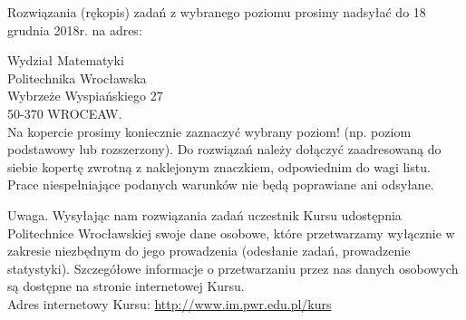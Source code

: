 \documentclass[10pt]{article}
\begin{document}
Rozwiązania (rękopis) zadań z wybranego poziomu prosimy nadsyłać do 18 grudnia 2018r. na adres:

Wydział Matematyki\\
Politechnika Wrocławska\\
Wybrzeże Wyspiańskiego 27\\
50-370 WROCEAW.\\
Na kopercie prosimy koniecznie zaznaczyć wybrany poziom! (np. poziom podstawowy lub rozszerzony). Do rozwiązań należy dołączyć zaadresowaną do siebie kopertę zwrotną z naklejonym znaczkiem, odpowiednim do wagi listu. Prace niespełniające podanych warunków nie będą poprawiane ani odsyłane.

Uwaga. Wysyłając nam rozwiązania zadań uczestnik Kursu udostępnia Politechnice Wrocławskiej swoje dane osobowe, które przetwarzamy wyłącznie w zakresie niezbędnym do jego prowadzenia (odesłanie zadań, prowadzenie statystyki). Szczegółowe informacje o przetwarzaniu przez nas danych osobowych są dostępne na stronie internetowej Kursu.\\
Adres internetowy Kursu: \href{http://www.im.pwr.edu.pl/kurs}{http://www.im.pwr.edu.pl/kurs}
\end{document}
